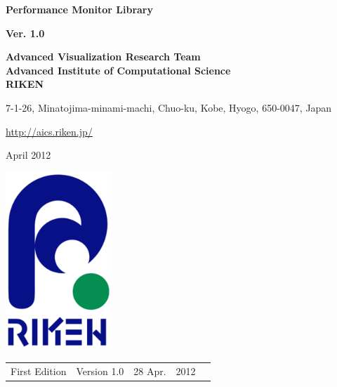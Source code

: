 \documentclass[a4paper,10pt,oneside,fleqn]{jsbook}
\begin{document}
\begin{titlepage}
\begin{center}
\vspace*{2cm}
{\huge \textbf{Performance Monitor Library}}\\
\vspace{1cm}

{\large \textbf{Ver. 1.0}}\\
\vspace{1.0cm}

{\large \textbf{Advanced Visualization Research Team}\\
\large \textbf{Advanced Institute of Computational Science}\\
\large \textbf{RIKEN}\\
\vspace{1cm}
}

{7-1-26, Minatojima-minami-machi, Chuo-ku, Kobe, Hyogo, 650-0047, Japan}\\
\vspace{0.5cm}

\url{http://aics.riken.jp/}\\

\vspace{1.0cm}




April 2012\\
\vspace{3cm}

\includegraphics[width=4cm,bb=-80 0 220 500]{RIKEN_logo_300x500.eps}

\end{center}
\end{titlepage}
\newpage

%
\frontmatter

\begin{tabular}{llllr}
First Edition  &  Version 1.0  & 28 Apr. & 2012



\end{tabular}
\end{document}
